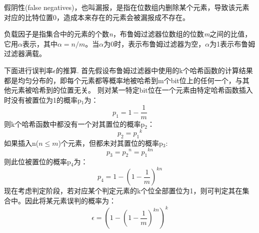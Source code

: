 \begin{definition}
	假阴性(false negatives)，也叫漏报，是指在位数组内删除某个元素，导致该元素对应的比特位置0，造成本来存在的元素会被漏报成不存在。
\end{definition}

\begin{definition}
	负载因子是指集合中的元素的个数\textit{n}，布鲁姆过滤器位数组的位数\textit{m}之间的比值，它用\begin{math} \alpha \end{math}表示，其中\begin{math} \alpha  = {n/m} \end{math}。当\begin{math} \alpha \end{math}为0时，表示布鲁姆过滤器为空，\begin{math} \alpha \end{math}为1表示布鲁姆过滤器满载。
\end{definition}

下面进行误判率\begin{math}\epsilon\end{math}的推算.
首先假设布鲁姆过滤器中使用的k个哈希函数的计算结果都是均匀分布的，即每个元素都等概率地被哈希到m个bit位上的任何一个，与其他元素被哈希到的位置无关。
则对某一特定bit位在一个元素由特定哈希函数插入时没有被置位为1的概率p$_1$为：
\begin{equation}
p_1 = 1-\frac{1}{m}
\end{equation}
则k个哈希函数中都没有一个对其置位的概率p$_2$：
\begin{equation}
p_2 = {p_1}^k
\end{equation}
如果插入n(\begin{math}n\leqslant m\end{math})个元素，但都未对其置位的概率p$_3$:
\begin{equation}
p_3 = {p_2}^n = {p_1}^{kn}
\end{equation}
则此位被置位的概率p$_4$为：
\begin{equation}
p_4 = 1 - \left(1 - \frac{1}{m}\right)^{kn}
\label{equ:alpha}
\end{equation}
现在考虑判定阶段，若对应某个判定元素的k个位全部置位为1，则可判定其在集合中。因此将某元素误判的概率为：
\begin{equation}
\epsilon = \left(1 - \left(1 - \frac{1}{m}\right)^{kn}\right)^k
\label{equ:epsilon}
\end{equation}


